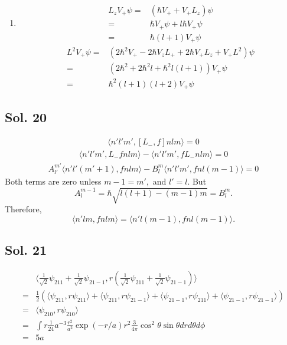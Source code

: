 \begin{enumerate}
    \item 
    \begin{align*}
        L_zV_+\psi = &
        (\hbar V_+ + V_+L_z)\psi\\
        =&\hbar V_+\psi + l\hbar V_+\psi\\
        =&\hbar(l+1)V_+\psi
    \end{align*}
    \begin{align*}
        L^2V_+\psi = &
        (2\hbar^2V_+ - 2\hbar V_zL_+ + 2\hbar V_+ L_z + V_+L^2)\psi\\
        =&(2\hbar^2+2\hbar^2l+\hbar^2l(l+1) )V_+\psi\\
        =&\hbar^2(l+1)(l+2)V_+\psi
    \end{align*}
    
\end{enumerate}

\subsection*{Sol. 20}
\begin{align*}
    \langle n'l'm', [L_-,f]nlm\rangle=0
\end{align*}
\begin{align*}
    \langle n'l'm', L_-fnlm\rangle
    -\langle n'l'm', fL_-nlm\rangle=0
\end{align*}
\begin{align*}
    A^{m'}_{l'}
    \langle n'l'(m'+1), fnlm\rangle
    -
    B^m_l \langle n'l'm', fnl(m-1)\rangle = 0
\end{align*}
Both terms are zero unless $m-1=m',$ and $l'=l.$ But
$$
A^{m-1}_l = \hbar\sqrt{l(l+1)-(m-1)m}
=B^m_l.
$$
Therefore, 
$$
\langle n'lm, fnlm\rangle
=
\langle n'l(m-1), fnl(m-1)\rangle.
$$

\subsection*{Sol. 21}
\begin{align*}
    &\langle \frac{1}{\sqrt{2}}\psi_{211}
    +\frac{1}{\sqrt{2}}\psi_{21-1},
    r
    (\frac{1}{\sqrt{2}}\psi_{211}
    +\frac{1}{\sqrt{2}}\psi_{21-1})
    \rangle\\
    =&\frac{1}{2}
    (\langle
    \psi_{211}, r\psi_{211}
    \rangle+
    \langle
    \psi_{211}, r\psi_{21-1}
    \rangle+
    \langle
    \psi_{21-1}, r\psi_{211}
    \rangle+
    \langle
    \psi_{21-1}, r\psi_{21-1}
    \rangle)\\
    =&\langle\psi_{210}, r\psi_{210}\rangle\\
    =&
    \int r\frac{1}{24}a^{-3}
    \frac{r^2}{a^2}\exp(-r/a)r^2
    \frac{3}{4\pi}\cos^2\theta\sin\theta drd\theta d\phi\\
    =&5a
\end{align*}

